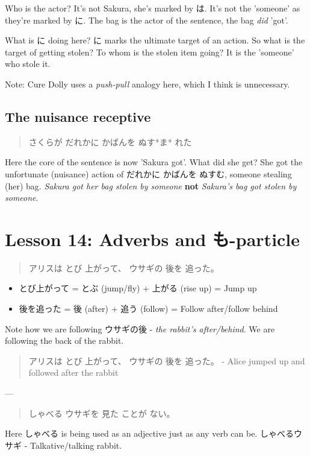 \documentclass[11pt]{article}
\begin{document}
Who is the actor? It's not Sakura, she's marked by は. It's not the 'someone' as they're marked by に. The bag is the actor of the sentence, the bag \emph{did} 'got'.

What is に doing here? に marks the ultimate target of an action. So what is the target of getting stolen? To whom is the stolen item going? It is the 'someone' who stole it.

Note: Cure Dolly uses a \emph{push-pull} analogy here, which I think is unnecessary.

\subsection{The nuisance receptive}
\label{sec:org850ca3a}
\begin{quote}
さくらが だれかに かばんを ぬす*ま* れた
\end{quote}
Here the core of the sentence is now 'Sakura got'. What did she get? She got the unfortunate (nuisance) action of だれかに かばんを ぬすむ, someone stealing (her) bag. \emph{Sakura got her bag stolen by someone} \textbf{not} \emph{Sakura's bag got stolen by someone}.
\section{Lesson 14: Adverbs and も-particle}
\label{sec:org46c45be}
\begin{quote}
アリスは とび 上がって、 ウサギの 後を 追った。
\end{quote}
\begin{itemize}
\item とび上がって = とぶ (jump/fly) + 上がる (rise up) = Jump up
\item 後を追った = 後 (after) + 追う (follow) = Follow after/follow behind
\end{itemize}

Note how we are following ウサギの後 - \emph{the rabbit's after/behind}. We are following the back of the rabbit.
\begin{quote}
アリスは とび 上がって、 ウサギの 後を 追った。 - Alice jumped up and followed after the rabbit
\end{quote}

---

\begin{quote}
しゃべる ウサギを 見た ことが ない。
\end{quote}
Here しゃべる is being used as an adjective just as any verb can be. しゃべるウサギ - Talkative/talking rabbit.
\end{document}
